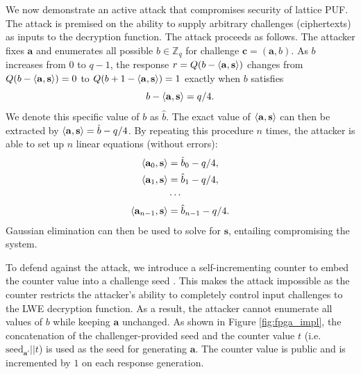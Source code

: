 We now demonstrate an active attack that compromises security of lattice PUF. The attack is premised on the ability to supply arbitrary challenges (ciphertexts) as inputs to the decryption function. 
The attack proceeds as follows. 
The attacker fixes $\mathbf{a}$ and enumerates all possible $b\in \mathbb{Z}_q$ for challenge $\mathbf{c} = (\mathbf{a},b)$.
As $b$ increases from $0$ to $q-1$, the response $r = Q(b-\langle\mathbf{a},\mathbf{s}\rangle)$ changes from  $Q(b-\langle\mathbf{a},\mathbf{s}\rangle) = 0$ to $Q(b+1-\langle\mathbf{a},\mathbf{s}\rangle) = 1$ exactly when $b$ satisfies
\begin{equation*}
b-\langle\mathbf{a},\mathbf{s}\rangle = q/4.
\end{equation*}
We denote this specific value of $b$ as $\hat{b}$. 
The exact value of $\langle\mathbf{a},\mathbf{s}\rangle$ can then be extracted by $\langle\mathbf{a},\mathbf{s}\rangle = \hat{b} - q/4$. 
By repeating this procedure $n$ times, the attacker is able to set up $n$ linear equations (without errors):  
\begin{align*}
\label{eq:secret_eqs}
    \langle\mathbf{a}_0,\mathbf{s}\rangle &= \hat{b}_0 - q/4, \\
    \langle\mathbf{a}_1,\mathbf{s}\rangle &= \hat{b}_1 - q/4, \\
    & \cdots \\
    \langle\mathbf{a}_{n-1},\mathbf{s}\rangle &= \hat{b}_{n-1} - q/4.
\end{align*}
Gaussian elimination can then be used to solve for $\mathbf{s}$, entailing compromising the system. 

To defend against the attack, we introduce a self-incrementing counter to embed the counter value into a challenge seed \cite{yu2016lockdown}.
This makes the attack impossible as the counter restricts the attacker's ability to completely control input challenges to the LWE decryption function.
As a result, the attacker cannot enumerate all values of $b$ while keeping $\mathbf{a}$ unchanged. 
As shown in Figure \ref{fig:fpga_impl}, the concatenation of the challenger-provided seed and the counter value $t$ (i.e. $\text{seed}_{\mathbf{a}'}||t$) is used as the seed for generating $\mathbf{a}$. 
The counter value is public and is incremented by $1$ on each response generation.

